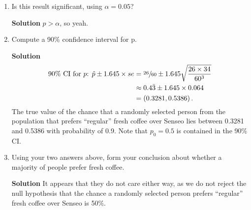 \begin{enumerate}
\begin{enumerate}
        \item Is this result significant, using $\alpha = 0.05$?
        \begin{framed}{\textbf{Solution}}
        $p>\alpha$, so yeah.
        \end{framed}
        
        \item Compute a 90\% confidence interval for p.
        \begin{framed}{\textbf{Solution}}
        \begin{align}
            \text{90\% CI for $p$: } \Hat{p} \pm 1.645 \times se &= \sfrac{26}{60} \pm 1.645 \sqrt{\frac{26 \times 34}{60^3}} \\
            &\approx 0.4\bar{3} \pm 1.645 \times 0.064 \\
            &= \left( 0.3281 , 0.5386\right).
        \end{align}
        The true value of the chance that a randomly selected person from the population that prefers ``regular'' fresh coffee over Senseo lies between 0.3281 and 0.5386 with probability of 0.9. Note that $p_0 = 0.5$ is contained in the 90\% CI.  
        \end{framed}
        
        \item Using your two answers above, form your conclusion about whether a majority of people prefer fresh coffee.
        \begin{framed}{\textbf{Solution}}
        It appears that they do not care either way, as we do not reject the null hypothesis that the chance a randomly selected person prefers ``regular'' fresh coffee over Senseo is 50\%.
        \end{framed}
    \end{enumerate}
    

\end{enumerate}
